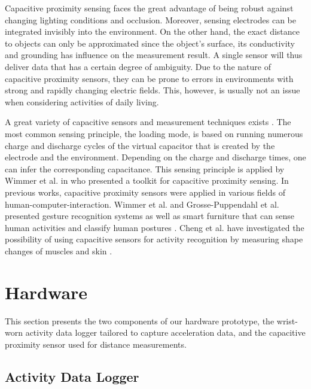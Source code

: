 \documentclass[runningheads,a4paper]{llncs}
\begin{document}
Capacitive proximity sensing faces the great advantage of being robust against changing lighting conditions and occlusion. Moreover, sensing electrodes can be integrated invisibly into the environment. On the other hand, the exact distance to objects can only be approximated since the object's surface, its conductivity and grounding has influence on the measurement result. A single sensor will thus deliver data that has a certain degree of ambiguity. Due to the nature of capacitive proximity sensors, they can be prone to errors in environments with strong and rapidly changing electric fields. This, however, is usually not an issue when considering activities of daily living. 

A great variety of capacitive sensors and measurement techniques exists \cite{Smith1999}. The most common sensing principle, the loading mode, is based on running numerous charge and discharge cycles of the virtual capacitor that is created by the electrode and the environment. Depending on the charge and discharge times, one can infer the corresponding capacitance. This sensing principle is applied by Wimmer et al. in \cite{Wimmer2007} who presented a toolkit for capacitive proximity sensing. In previous works, capacitive proximity sensors were applied in various fields of human-computer-interaction. Wimmer et al. and Grosse-Puppendahl et al. presented gesture recognition systems \cite{Wimmer,Grosse-puppendahl2012} as well as smart furniture that can sense human activities \cite{Wimmer} and classify human postures \cite{Grosse-puppendahl2011}. Cheng et al. have investigated the possibility of using capacitive sensors for activity recognition by measuring shape changes of muscles and skin \cite{Cheng2010}. 

\section{Hardware}
\label{sect:hardware}

This section presents the two components of our hardware prototype, the wrist-worn activity data logger tailored to capture acceleration data, and the capacitive proximity sensor used for distance measurements.

\subsection{Activity Data Logger}
\end{document}
